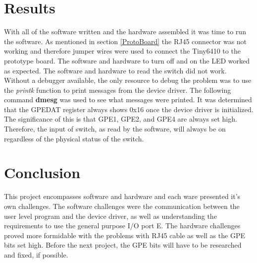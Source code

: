 \documentclass[12pt,conference]{IEEEtran}
\begin{document}
\section{Results}
With all of the software written and the hardware assembled it was time to run the software. As mentioned in section \ref{ProtoBoard} the RJ45 connector was not working and therefore jumper wires were used to connect the Tiny6410 to the prototype board. The software and hardware to turn off and on the LED worked as expected. The software and hardware to read the switch did not work. Without a debugger available, the only resource to debug the problem was to use the \emph{printk} function to print messages from the device driver. The following command \textbf{dmesg} was used to see what messages were printed. It was determined that the GPEDAT register always shows 0x16 once the device driver is initialized. The significance of this is that GPE1, GPE2, and GPE4 are always set high. Therefore, the input of switch, as read by the software, will always be on regardless of the physical status of the switch.

\section{Conclusion}
This project encompasses software and hardware and each ware presented it's own challenges. The software challenges were the communication between the user level program and the device driver, as well as understanding the requirements to use the general purpose I/O port E. The hardware challenges proved more formidable with the problems with RJ45 cable as well as the GPE bits set high. Before the next project, the GPE bits will have to be researched and fixed, if possible.
\end{document}
